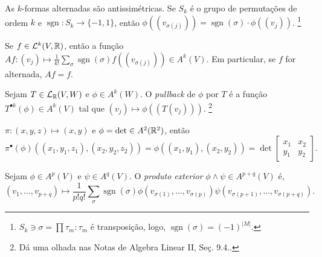 \begin{corollary}
    As $k$-formas alternadas são antissimétricas. Se \(S_k\) é o grupo de permutações de ordem \(k\) e \(\operatorname{sgn} : S_k  \to \{-1, 1\}\), então \(\phi((v_{\sigma(j)})) = \operatorname{sgn}(\sigma) \cdot \phi((v_j))\). \footnote{\(S_k \ni \sigma = \prod \tau_m : \tau_m\) é transposição, logo, \(\operatorname{sgn}(\sigma) = (-1)^{|M|}\). }
\end{corollary}




\begin{exercise}
    Se \(f \in \mathcal{L}^k(V,\mathbb{R})\), então a função \(Af :  (v_j) \mapsto \frac{1}{k!} \sum_{\sigma} \operatorname{sgn}(\sigma) f((v_{\sigma(j)}))\in A^k(V)\). Em particular, se \(f\) for alternada, \(Af = f \). 
\end{exercise}

\begin{definition}
    Sejam \(T \in \mathcal{L}_{\mathbb{R}}(V,W)\) e \(\phi \in A^k(W)\). O \emph{pullback} de \(\phi \) por \(T\) é a função \(T^{\bullet k}(\phi) \in A^k(V)\) tal que \((v_j) \mapsto \phi ((T (v_j)))\). \footnote{Dá uma olhada nas Notas de Algebra Linear II, Seç. 9.4..}
\end{definition}

\begin{example}
    \(\pi: (x,y,z) \mapsto (x,y)\) e \(\phi = \det \in A^2(\mathbb{R}^2)\), então 
\vspace{-0cm}
    \[\pi^{\bullet}(\phi) ((x_1,y_1,z_1), (x_2,y_2,z_2)) = \phi( (x_1,y_1), (x_2,y_2)) = \det \begin{bmatrix}
        x_1 & x_2\\ 
        y_1 & y_2
    \end{bmatrix}. \] 
\end{example}

\let\originalwedge\wedge 

\begin{definition}
    Sejam \(\phi \in A^p(V)\) e \(\psi \in A^q(V)\). O \emph{produto exterior} \(\phi \wedge \psi \in A^{p+q} (V)\) é,  
    {\[(v_1, \ldots, v_{p+q}) \mapsto \frac{1}{p!q!} \sum_\sigma \operatorname{sgn}(\sigma) \phi(v_{\sigma(1)}, \ldots, v_{\sigma(p)}) \psi(v_{\sigma(p+1)},\ldots, v_{\sigma(p+q)}).\]}
\end{definition}

